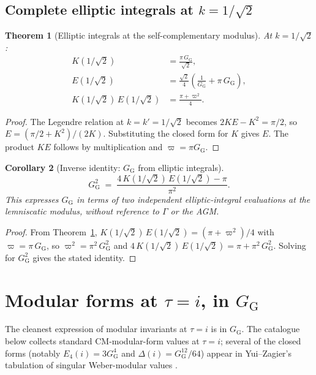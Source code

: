 \documentclass[11pt]{article}
\newtheorem{theorem}{Theorem}[section]
\newtheorem{corollary}[theorem]{Corollary}
\theoremstyle{definition}
\theoremstyle{remark}
\newcommand{\GG}{G_{\!\scriptscriptstyle\mathrm{G}}}
\begin{document}
\subsection{Complete elliptic integrals at $k = 1/\sqrt 2$}\label{sec:elliptic}

\begin{theorem}[Elliptic integrals at the self-complementary modulus]\label{thm:elliptic}
At $k = 1/\sqrt 2$:
\begin{align}
K(1/\sqrt 2) &= \frac{\pi\,\GG}{\sqrt 2}, \\
E(1/\sqrt 2) &= \frac{\sqrt 2}{4}\!\left(\frac{1}{\GG} + \pi\,\GG\right), \\
K(1/\sqrt 2)\,E(1/\sqrt 2) &= \frac{\pi + \varpi^2}{4}.
\end{align}
\end{theorem}

\begin{proof}
The Legendre relation at $k = k' = 1/\sqrt 2$ becomes $2KE - K^2 = \pi/2$,
so $E = (\pi/2 + K^2)/(2K)$. Substituting the closed form for $K$ gives
$E$. The product $KE$ follows by multiplication and $\varpi = \pi\GG$.
\end{proof}

\begin{corollary}[Inverse identity: $\GG$ from elliptic integrals]\label{cor:GG-inverse}
\[
\GG^2 \;=\; \frac{4\,K(1/\sqrt 2)\,E(1/\sqrt 2) - \pi}{\pi^2}.
\]
This expresses $\GG$ in terms of two independent elliptic-integral evaluations
at the lemniscatic modulus, without reference to $\Gamma$ or the AGM.
\end{corollary}

\begin{proof}
From Theorem~\ref{thm:elliptic}, $K(1/\sqrt 2)\,E(1/\sqrt 2) = (\pi + \varpi^2)/4$
with $\varpi = \pi\,\GG$, so $\varpi^2 = \pi^2\,\GG^2$ and
$4\,K(1/\sqrt 2)\,E(1/\sqrt 2) = \pi + \pi^2\,\GG^2$. Solving for $\GG^2$
gives the stated identity.
\end{proof}

\section{Modular forms at $\tau = i$, in $\GG$}\label{sec:modforms}

The cleanest expression of modular invariants at $\tau = i$ is in $\GG$.
The catalogue below collects standard CM-modular-form values at $\tau = i$;
several of the closed forms (notably $E_4(i) = 3\GG^4$ and $\Delta(i) = \GG^{12}/64$)
appear in Yui--Zagier's tabulation of singular Weber-modular values
\cite{yui-zagier}.
\end{document}
